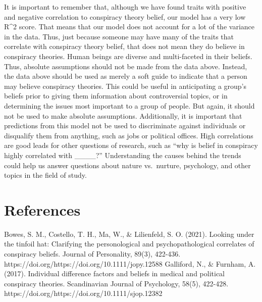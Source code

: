 \documentclass[11pt]{article}
\begin{document}
It is important to remember that, although we have found traits with
positive and negative correlation to conspiracy theory belief, our model
has a very low R\^{}2 score. That means that our model does not account
for a lot of the variance in the data. Thus, just because someone may
have many of the traits that correlate with conspiracy theory belief,
that does not mean they do believe in conspiracy theories. Human beings
are diverse and multi-faceted in their beliefs. Thus, absolute
assumptions should not be made from the data above. Instead, the data
above should be used as merely a soft guide to indicate that a person
may believe conspiracy theories. This could be useful in anticipating a
group's beliefs prior to giving them information about controversial
topics, or in determining the issues most important to a group of
people. But again, it should not be used to make absolute assumptions.
Additionally, it is important that predictions from this model not be
used to discriminate against individuals or disqualify them from
anything, such as jobs or political offices. High correlations are good
leads for other questions of research, such as ``why is belief in
conspiracy highly correlated with \_\_\_\_?'' Understanding the causes
behind the trends could help us answer questions about nature
vs.~nurture, psychology, and other topics in the field of study.

\newpage
\hypertarget{references}{%
\section*{References}\label{references}}

Bowes, S. M., Costello, T. H., Ma, W., \& Lilienfeld, S. O. (2021).
Looking under the tinfoil hat: Clarifying the personological and
psychopathological correlates of conspiracy beliefs. Journal of
Personality, 89(3), 422-436.
https://doi.org/https://doi.org/10.1111/jopy.12588 Galliford, N., \&
Furnham, A. (2017). Individual difference factors and beliefs in medical
and political conspiracy theories. Scandinavian Journal of Psychology,
58(5), 422-428. https://doi.org/https://doi.org/10.1111/sjop.12382


    
    
    
\end{document}
